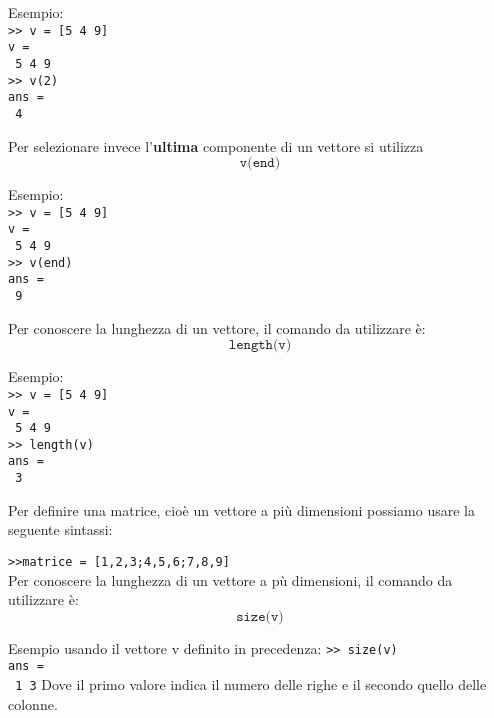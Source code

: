 Esempio: \\
\texttt{>> v = [5 4 9]} \\
\texttt{v = } \\
\texttt{\hspace{0.5cm} 5 \hspace{0.5cm} 4 \hspace{0.5cm} 9} \\
\texttt{>> v(2)} \\
\texttt{ans = } \\
\texttt{\hspace{0.5cm} 4} \break

Per selezionare invece l'\textbf{ultima} componente di un vettore si utilizza
$$ \texttt{v(end)} $$

Esempio: \\
\texttt{>> v = [5 4 9]} \\
\texttt{v = } \\
\texttt{\hspace{0.5cm} 5 \hspace{0.5cm} 4 \hspace{0.5cm} 9} \\
\texttt{>> v(end)} \\
\texttt{ans = } \\
\texttt{\hspace{0.5cm} 9} \break

Per conoscere la lunghezza di un vettore, il comando da utilizzare è:
$$\texttt{length(v)} $$

Esempio: \\
\texttt{>> v = [5 4 9]} \\
\texttt{v = } \\
\texttt{\hspace{0.5cm} 5 \hspace{0.5cm} 4 \hspace{0.5cm} 9} \\
\texttt{>> length(v)} \\
\texttt{ans = } \\
\texttt{\hspace{0.5cm} 3} \break


Per definire una matrice, cioè un vettore a più dimensioni possiamo usare la seguente sintassi:

\texttt{>>matrice = [1,2,3;4,5,6;7,8,9]} \\

Per conoscere la lunghezza di un vettore a pù dimensioni, il comando da utilizzare è:
$$\texttt{size(v)} $$

Esempio usando il vettore v definito in precedenza: 
\texttt{>> size(v)} \\
\texttt{ans = } \\
\texttt{\hspace{0.5cm} 1 \hspace{0.5cm} 3} \break
Dove il primo valore indica il numero delle righe e il secondo quello delle colonne.


